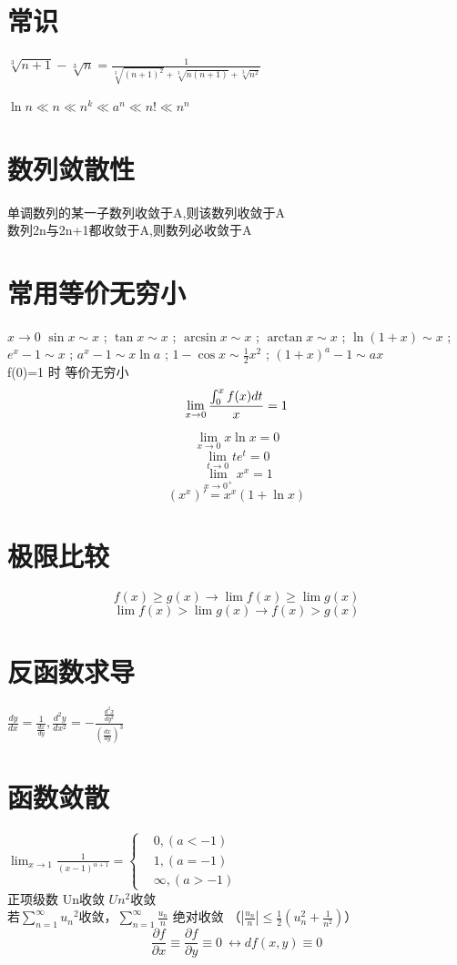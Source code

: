 \documentclass[UTF8]{ctexart}
\begin{document}
\section{常识}
$\sqrt[3]{n+1}-\sqrt[3]{n}=\frac{1}{\sqrt[3]{{(n+1)}^2}+\sqrt[3]{n(n+1)}+\sqrt[3]{n^2}}$

$\ln n \ll n \ll n^k \ll a^n \ll n! \ll n^n$


\section{数列敛散性}
单调数列的某一子数列收敛于A,则该数列收敛于A \\
数列{2n}与{2n+1}都收敛于A,则数列必收敛于A


\section{常用等价无穷小}
 $ x \rightarrow 0$
$ \sin x \sim x$ ; $ \tan x \sim x$ ; $ \arcsin x \sim x$ ; $ \arctan x \sim x$ ; $ \ln({1+x}) \sim x $ ; $ e^x -1 \sim x$ ; $ a^x -1 \sim x \ln a $ ; $ 1-\cos x \sim \frac{1}{2} x^2 $ ; $ {(1+x)}^a -1 \sim ax$ \\

f(0)=1 时 等价无穷小 \\
$$ \lim_{x \rightarrow 0 } {{\int_0^x f(x)dt} \over {x}} =1$$

$$ \lim_{x \rightarrow 0} x \ln x =0$$
$$\lim_{t \rightarrow 0} t e^t =0 $$
$$\lim _{x \rightarrow 0^+} x^x =1$$
$$(x^x)'=x^x(1+ \ln x)$$

\section{极限比较}
$$ f(x) \geq g(x) \rightarrow \lim f(x) \geq \lim g(x) $$
$$ \lim f(x) > \lim g(x) \rightarrow f(x) > g(x) $$

\section{反函数求导}
$\frac{dy}{dx}=\frac{1}{\frac{dx}{dy}} , \frac{d^2y}{dx^2}=-\frac{\frac{d^2x}{dy^2}}{{(\frac{dx}{dy})}^3}$

\section{函数敛散}
$ \lim_{x \rightarrow 1} \frac{1}{(x-1)^{α+1}}=
  \begin{cases}
  &0 , (a<-1) \\
  &1 , (a=-1) \\
  &\infty ,(a>-1)
\end{cases}$ \\
正项级数 Un收敛 $Un^2$收敛 \\
若$\sum_{n=1}^\infty {u_n}^2 $收敛，$\sum_{n=1}^\infty \frac{u_n}{n} $ 绝对收敛
（$\left\vert \frac{u_n}{n} \right\vert \leq  \frac{1}{2} (u_n^2 + \frac{1}{n^2})$）
$$ \frac{\partial f}{\partial x} \equiv \frac{\partial f}{\partial y} \equiv 0\ \leftrightarrow df({x,y}) \equiv 0 $$
\end{document}
